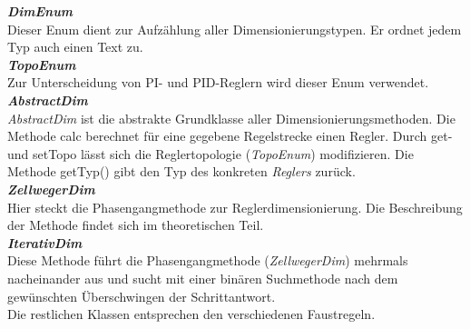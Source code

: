 \textit{\textbf{DimEnum}}\\
Dieser Enum dient zur Aufzählung aller Dimensionierungstypen. Er ordnet jedem Typ auch einen Text zu.\\

\textit{\textbf{TopoEnum}}\\
Zur Unterscheidung von PI- und PID-Reglern wird dieser Enum verwendet.\\

\textit{\textbf{AbstractDim}}\\
\textit{AbstractDim} ist die abstrakte Grundklasse aller Dimensionierungsmethoden. Die Methode calc berechnet für eine gegebene Regelstrecke einen Regler. Durch get- und setTopo lässt sich die Reglertopologie (\textit{TopoEnum}) modifizieren. Die Methode getTyp() gibt den Typ des konkreten \textit{Reglers} zurück.\\

\textit{\textbf{ZellwegerDim}}\\
Hier steckt die Phasengangmethode zur Reglerdimensionierung. Die Beschreibung der Methode findet sich im theoretischen Teil.\\

\textit{\textbf{IterativDim}}\\
Diese Methode führt die Phasengangmethode (\textit{ZellwegerDim}) mehrmals nacheinander aus und sucht mit einer binären Suchmethode nach dem gewünschten Überschwingen der Schrittantwort.\\

Die restlichen Klassen entsprechen den verschiedenen Faustregeln.


